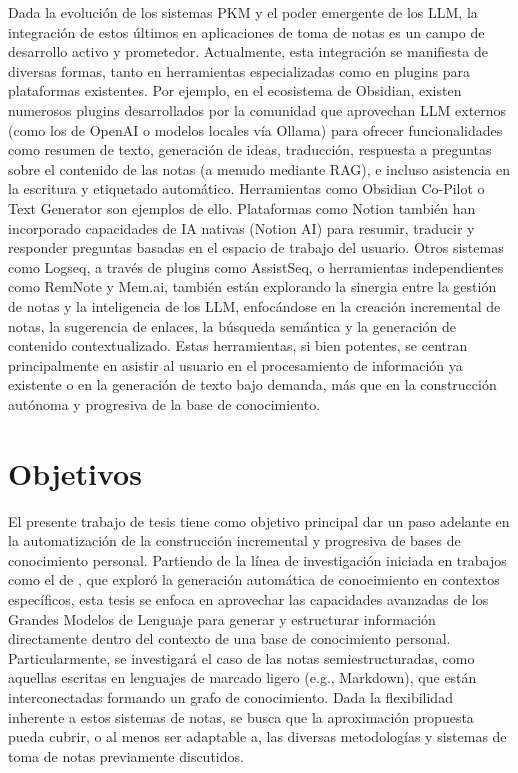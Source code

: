 Dada la evolución de los sistemas PKM y el poder emergente de los LLM, la integración de estos últimos en aplicaciones de toma de notas es un campo de desarrollo activo y prometedor. Actualmente, esta integración se manifiesta de diversas formas, tanto en herramientas especializadas como en plugins para plataformas existentes. Por ejemplo, en el ecosistema de Obsidian, existen numerosos plugins desarrollados por la comunidad que aprovechan LLM externos (como los de OpenAI o modelos locales vía Ollama) para ofrecer funcionalidades como resumen de texto, generación de ideas, traducción, respuesta a preguntas sobre el contenido de las notas (a menudo mediante RAG), e incluso asistencia en la escritura y etiquetado automático. Herramientas como Obsidian Co-Pilot o Text Generator son ejemplos de ello. Plataformas como Notion también han incorporado capacidades de IA nativas (Notion AI) para resumir, traducir y responder preguntas basadas en el espacio de trabajo del usuario. Otros sistemas como Logseq, a través de plugins como AssistSeq, o herramientas independientes como RemNote y Mem.ai, también están explorando la sinergia entre la gestión de notas y la inteligencia de los LLM, enfocándose en la creación incremental de notas, la sugerencia de enlaces, la búsqueda semántica y la generación de contenido contextualizado. Estas herramientas, si bien potentes, se centran principalmente en asistir al usuario en el procesamiento de información ya existente o en la generación de texto bajo demanda, más que en la construcción autónoma y progresiva de la base de conocimiento.

\section{Objetivos}
\label{sec:objetivos}

El presente trabajo de tesis tiene como objetivo principal dar un paso adelante en la automatización de la construcción incremental y progresiva de bases de conocimiento personal. Partiendo de la línea de investigación iniciada en trabajos como el de \citet{fragaAutomaticGenerationKnowledge2023}, que exploró la generación automática de conocimiento en contextos específicos, esta tesis se enfoca en aprovechar las capacidades avanzadas de los Grandes Modelos de Lenguaje para generar y estructurar información directamente dentro del contexto de una base de conocimiento personal. Particularmente, se investigará el caso de las notas semiestructuradas, como aquellas escritas en lenguajes de marcado ligero (e.g., Markdown), que están interconectadas formando un grafo de conocimiento. Dada la flexibilidad inherente a estos sistemas de notas, se busca que la aproximación propuesta pueda cubrir, o al menos ser adaptable a, las diversas metodologías y sistemas de toma de notas previamente discutidos.

